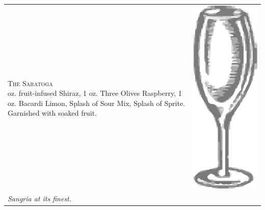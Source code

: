 \documentclass{article}
\begin{document}
\begin{tabular}{*{2}{m{}}}
{\raggedleft\huge\textsc{The Saratoga}\\*}
\raggedleft 3 oz. fruit-infused Shiraz, 1 oz. Three Olives Raspberry, 1 oz. Bacardi Limon, Splash of Sour Mix, Splash of Sprite. Garnished with soaked fruit. & \includegraphics{wine_glass.png}\\
\raggedleft\small\textit{Sangria at its finest.}
\end{tabular}
\end{document}
